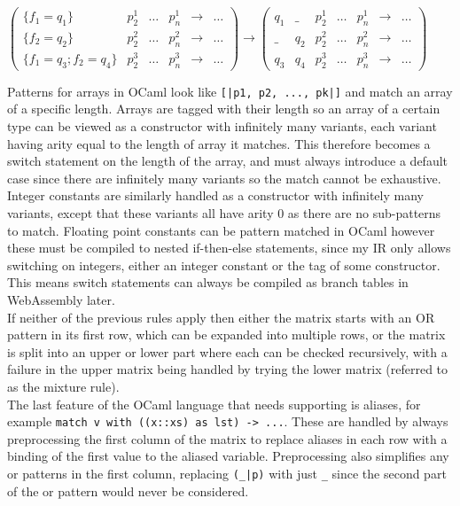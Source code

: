 $
\begin{pmatrix}
\{f_1=q_1\} & p^1_2 & \dots & p^1_n & \to & \dots \\
\{f_2=q_2\} & p^2_2 & \dots & p^2_n & \to &\dots \\
\{f_1=q_3; f_2=q_4\} & p^3_2 & \dots & p^3_n & \to &\dots
\end{pmatrix}
\to
\begin{pmatrix}
q_1 & \_ & p^1_2 & \dots & p^1_n  & \to & \dots \\
\_ & q_2 & p^2_2 & \dots & p^2_n  & \to & \dots \\
 q_3 & q_4 & p^3_2 & \dots & p^3_n  & \to & \dots
\end{pmatrix}
$

Patterns for arrays in OCaml look like \verb"[|p1, p2, ..., pk|]" and match an array of a specific length. Arrays are tagged with their length so an array of a certain type can be viewed as a constructor with infinitely many variants, each variant having arity equal to the length of array it matches. This therefore becomes a switch statement on the length of the array, and must always introduce a default case since there are infinitely many variants so the match cannot be exhaustive. Integer constants are similarly handled as a constructor with infinitely many variants, except that these variants all have arity 0 as there are no sub-patterns to match. Floating point constants can be pattern matched in OCaml however these must be compiled to nested if-then-else statements, since my IR only allows switching on integers, either an integer constant or the tag of some constructor. This means switch statements can always be compiled as branch tables in WebAssembly later. \\
If neither of the previous rules apply then either the matrix  starts with an OR pattern in its first row, which can be expanded into multiple rows, or the matrix is split into an upper or lower part where each can be checked recursively, with a failure in the upper matrix being handled by trying the lower matrix (referred to as the mixture rule).\\
The last feature of the OCaml language that needs supporting is aliases, for example \verb"match v with ((x::xs) as lst) -> ...". These are handled by always preprocessing the first column of the matrix to replace aliases in each row with a binding of the first value to the aliased variable. Preprocessing also simplifies any or patterns in the first column, replacing \verb"(_|p)" with just \verb|_| since the second part of the or pattern would never be considered.


